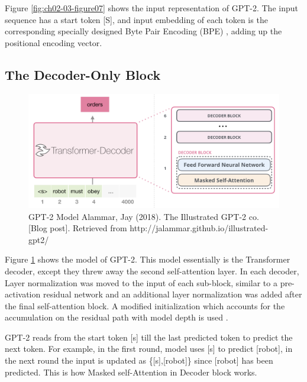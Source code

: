 \documentclass[]{krantz}
\begin{document}
Figure \ref{fig:ch02-03-figure07} shows the input representation of GPT-2. The input sequence has a start token {[}S{]}, and input embedding of each token is the corresponding specially designed Byte Pair Encoding (BPE) \citet{sennrich2015neural}, adding up the positional encoding vector.

\hypertarget{the-decoder-only-block}{%
\subsection{The Decoder-Only Block}\label{the-decoder-only-block}}

\begin{figure}

{\centering \includegraphics[width=0.7\linewidth]{figures/02-03-transfer-learning-for-nlp/gpt_decoder} 

}

\caption{GPT-2 Model  
 Alammar, Jay (2018). The Illustrated GPT-2 co. [Blog post]. Retrieved from http://jalammar.github.io/illustrated-gpt2/}\label{fig:ch02-03-figure08}
\end{figure}

Figure \ref{fig:ch02-03-figure08} shows the model of GPT-2. This model essentially is the Transformer decoder, except they threw away the second self-attention layer. In each decoder, Layer normalization \citet{ba2016layer} was moved to the input of each sub-block, similar to a pre-activation residual network \citet{he2016identity} and an additional layer normalization was added after the final self-attention block. A modified initialization which accounts for the accumulation on the residual path with model depth is used \citet{radford2019gpt2}.

GPT-2 reads from the start token {[}s{]} till the last predicted token to predict the next token. For example, in the first round, model uses {[}s{]} to predict {[}robot{]}, in the next round the input is updated as \{{[}s{]},{[}robot{]}\} since {[}robot{]} has been predicted. This is how Masked self-Attention in Decoder block works.
\end{document}
